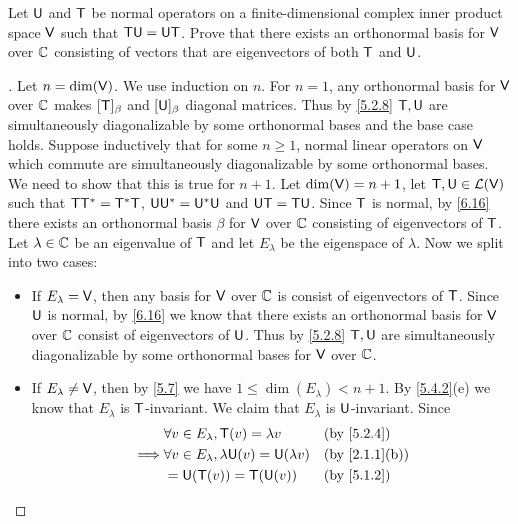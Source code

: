\begin{ex}\label{ex:6.6.10}
  Let \(\mathsf{U}\) and \(\mathsf{T}\) be normal operators on a finite-dimensional complex inner product space \(\mathsf{V}\) such that \(\mathsf{T} \mathsf{U} = \mathsf{U} \mathsf{T}\).
  Prove that there exists an orthonormal basis for \(\mathsf{V}\) over \(\mathbb{C}\) consisting of vectors that are eigenvectors of both \(\mathsf{T}\) and \(\mathsf{U}\).
\end{ex}

\begin{proof}[]
  Let \(n = \dim(\mathsf{V})\).
  We use induction on \(n\).
  For \(n = 1\), any orthonormal basis for \(\mathsf{V}\) over \(\mathbb{C}\) makes \([\mathsf{T}]_{\beta}\) and \([\mathsf{U}]_{\beta}\) diagonal matrices.
  Thus by \cref{5.2.8} \(\mathsf{T}, \mathsf{U}\) are simultaneously diagonalizable by some orthonormal bases and the base case holds.
  Suppose inductively that for some \(n \geq 1\), normal linear operators on \(\mathsf{V}\) which commute are simultaneously diagonalizable by some orthonormal bases.
  We need to show that this is true for \(n + 1\).
  Let \(\dim(\mathsf{V}) = n + 1\), let \(\mathsf{T}, \mathsf{U} \in \mathcal{L}(\mathsf{V})\) such that \(\mathsf{T} \mathsf{T}^* = \mathsf{T}^* \mathsf{T}\), \(\mathsf{U} \mathsf{U}^* = \mathsf{U}^* \mathsf{U}\) and \(\mathsf{U} \mathsf{T} = \mathsf{T} \mathsf{U}\).
  Since \(\mathsf{T}\) is normal, by \cref{6.16} there exists an orthonormal basis \(\beta\) for \(\mathsf{V}\) over \(\mathbb{C}\) consisting of eigenvectors of \(\mathsf{T}\).
  Let \(\lambda \in \mathbb{C}\) be an eigenvalue of \(\mathsf{T}\) and let \(E_{\lambda}\) be the eigenspace of \(\lambda\).
  Now we split into two cases:
  \begin{itemize}
    \item If \(E_{\lambda} = \mathsf{V}\), then any basis for \(\mathsf{V}\) over \(\mathbb{C}\) is consist of eigenvectors of \(\mathsf{T}\).
          Since \(\mathsf{U}\) is normal, by \cref{6.16} we know that there exists an orthonormal basis for \(\mathsf{V}\) over \(\mathbb{C}\) consist of eigenvectors of \(\mathsf{U}\).
          Thus by \cref{5.2.8} \(\mathsf{T}, \mathsf{U}\) are simultaneously diagonalizable by some orthonormal bases for \(\mathsf{V}\) over \(\mathbb{C}\).
    \item If \(E_{\lambda} \neq \mathsf{V}\), then by \cref{5.7} we have \(1 \leq \dim(E_{\lambda}) < n + 1\).
          By \cref{5.4.2}(e) we know that \(E_{\lambda}\) is \(\mathsf{T}\)-invariant.
          We claim that \(E_{\lambda}\) is \(\mathsf{U}\)-invariant.
          Since
          \begin{align*}
                     & \forall v \in E_{\lambda}, \T(v) = \lambda v             &  & \by{5.2.4}    \\
            \implies & \forall v \in E_{\lambda}, \lambda \U(v) = \U(\lambda v) &  & \by{2.1.1}[b] \\
                     & = \U(\T(v)) = \T(\U(v))                                  &  & \by{5.1.2}    \\

\end{align*}
\end{itemize}
\end{proof}
